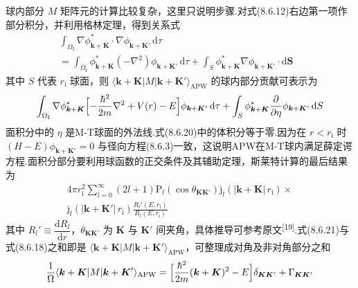 球内部分 $M$ 矩阵元的计算比较复杂，这里只说明步骤.对式(8.6.12)右边第一项作部分积分，并利用格林定理，得到关系式
\begin{equation}
\begin{aligned}
  \int_{\Omega_{\mathrm{I}}}\nabla\phi_{\boldsymbol{k}+\boldsymbol{K}}^{*}\cdot\nabla\phi_{\boldsymbol{k}+\boldsymbol{K}'}\,\mathrm{d}\tau&\\
  =\int_{\Omega_{\mathrm{I}}}\phi_{\boldsymbol{k}+\boldsymbol{K}}^{*}(-\nabla^{2})\phi_{\boldsymbol{k}+\boldsymbol{K}'}\,\mathrm{d}\tau
  +\int_{S}\phi_{\boldsymbol{k}+\boldsymbol{K}}^{*}\nabla\phi_{\boldsymbol{k}+\boldsymbol{K}'}\cdot\mathrm{d}\boldsymbol{S}&
\end{aligned}
\end{equation}
其中 $S$ 代表 $r_{\mathrm{i}}$ 球面，则 $\langle\boldsymbol{k}+\boldsymbol{K}|M|\boldsymbol{k}+\boldsymbol{K}'\rangle_{\mathrm{APW}}$ 的球内部分贡献可表示为
\begin{equation}
  \int_{\Omega_{\mathrm{I}}}\nabla\phi_{\boldsymbol{k}+\boldsymbol{K}}^{*}\Bigl[-\frac{\hbar^{2}}{2m}\nabla^{2}+V(r)-E\Bigr]\phi_{\boldsymbol{k}+\boldsymbol{K}'}\,\mathrm{d}\tau
  +\int_{S}\phi_{\boldsymbol{k}+\boldsymbol{K}}^{*}\frac{\partial}{\partial\eta}\phi_{\boldsymbol{k}+\boldsymbol{K}'}\,\mathrm{d}S
\end{equation}
面积分中的 $\eta$ 是M-T球面的外法线.式(8.6.20)中的体积分等于零.因为在 $r<r_{\mathrm{i}}$ 时 $(H-E)\phi_{\boldsymbol{k}+\boldsymbol{K}'}=0$ 与径向方程(8.6.3)一致，这说明APW在M-T球内满足薛定谔方程.面积分部分要利用球函数的正交条件及其辅助定理，斯莱特计算的最后结果为
\begin{equation}
\begin{aligned}
  4\pi r_{\mathrm{i}}^{2}\sum_{l=0}^{\infty}(2l+1)\mathrm{P}_{l}(\cos\theta_{\boldsymbol{K}\boldsymbol{K}'})\mathrm{j}_{l}(|\boldsymbol{k}+\boldsymbol{K}|\,r_{\mathrm{i}})\times\\
  \mathrm{j}_{l}(|\boldsymbol{k}+\boldsymbol{K}'|\,r_{\mathrm{i}})\frac{R_{l}'(E,r_{\mathrm{i}})}{R_{l}(E,r_{\mathrm{i}})}
\end{aligned}
\end{equation}
其中 $R_{l}'\equiv\dfrac{\mathrm{d}R_{l}}{\mathrm{d}r}$，$\theta_{\boldsymbol{K}\boldsymbol{K}'}$ 为 $\boldsymbol{K}$ 与 $\boldsymbol{K}'$ 间夹角，具体推导可参考原文\textsuperscript{[19]}.式(8.6.21)与式(8.6.18)之和即是 $\langle\boldsymbol{k}+\boldsymbol{K}|M|\boldsymbol{k}+\boldsymbol{K}'\rangle_{\mathrm{APW}}$，可整理成对角及非对角部分之和
\begin{equation}
  \frac{1}{\Omega}\langle\boldsymbol{k}+\boldsymbol{K}|M|\boldsymbol{k}+\boldsymbol{K}'\rangle_{\mathrm{APW}}
  =\Bigl[\frac{\hbar^{2}}{2m}(\boldsymbol{k}+\boldsymbol{K})^{2}-E\Bigr]\delta_{\boldsymbol{K}\boldsymbol{K}'}
  +\Gamma_{\boldsymbol{K}\boldsymbol{K}'}
\end{equation}
